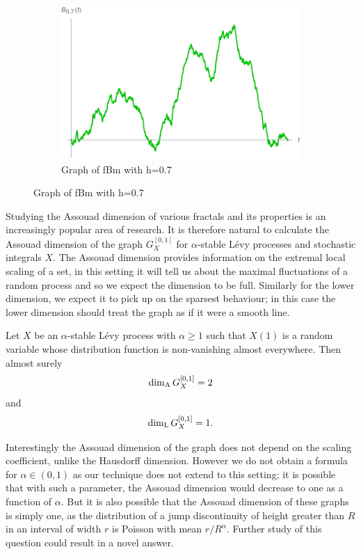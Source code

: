 \begin{figure}[h]
\begin{subfigure}[b]{0.3\textwidth}
		\includegraphics[width=\textwidth]{pics/ch-brownian/fbm0_7.pdf}
		\caption{Graph of fBm with h=0.7}
		\label{fig:fbm7}
	\end{subfigure}
\end{figure}


Studying the Assouad dimension of various fractals and its properties is an increasingly popular area of research. It is therefore natural to calculate the Assouad dimension of the graph $G_X^{[0,1]}$ for $\alpha$-stable L\'{e}vy processes and stochastic integrals $X$. The Assouad dimension provides information on the extremal local scaling of a set, in this setting it will tell us about the maximal fluctuations of a random process and so we expect the dimension to be full. Similarly for the lower dimension, we expect it to pick up on the sparsest behaviour; in this case the lower dimension should treat the graph as if it were a smooth line.


\begin{theorem}\label{Main}
	Let $X$ be an $\alpha$-stable L\'evy process with $\alpha \geq 1$ such that $X(1)$ is a random variable whose distribution function is non-vanishing almost everywhere. Then almost surely
	\[
	\dim_{\textup{A}} G_{X}^{[0,1]} = 2
	\]
	and 
	\[ 
	\dim_{\textup{L}} G_{X}^{[0,1]} = 1.
	\]
\end{theorem}

Interestingly the Assouad dimension of the graph does not depend on the scaling coefficient, unlike the Hausdorff dimension. However we do not obtain a formula for $\alpha \in (0,1)$ as our technique does not extend to this setting; it is possible that with such a parameter, the Assouad dimension would decrease to one as a function of $\alpha$. But it is also possible that the Assouad dimension of these graphs is simply one, as the distribution of a jump discontinuity of height greater than $R$ in an interval of width $r$ is Poisson with mean $r/R^\alpha$. Further study of this question could result in a novel answer.

